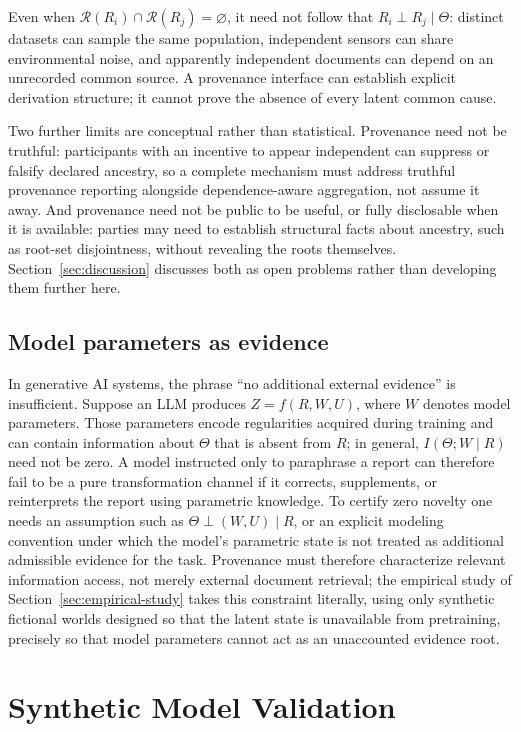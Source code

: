 \documentclass[11pt]{article}
\theoremstyle{definition}
\begin{document}
Even when $\mathcal R(R_i)\cap\mathcal R(R_j)=\varnothing$, it need not follow that $R_i\perp R_j\mid\Theta$: distinct datasets can sample the same population, independent sensors can share environmental noise, and apparently independent documents can depend on an unrecorded common source. A provenance interface can establish explicit derivation structure; it cannot prove the absence of every latent common cause.

Two further limits are conceptual rather than statistical. Provenance need not be truthful: participants with an incentive to appear independent can suppress or falsify declared ancestry, so a complete mechanism must address truthful provenance reporting alongside dependence-aware aggregation, not assume it away. And provenance need not be public to be useful, or fully disclosable when it is available: parties may need to establish structural facts about ancestry, such as root-set disjointness, without revealing the roots themselves. Section~\ref{sec:discussion} discusses both as open problems rather than developing them further here.

\subsection{Model parameters as evidence}
\label{sec:model-params}

In generative AI systems, the phrase ``no additional external evidence'' is insufficient. Suppose an LLM produces $Z=f(R,W,U)$, where $W$ denotes model parameters. Those parameters encode regularities acquired during training and can contain information about $\Theta$ that is absent from $R$; in general, $I(\Theta;W\mid R)$ need not be zero. A model instructed only to paraphrase a report can therefore fail to be a pure transformation channel if it corrects, supplements, or reinterprets the report using parametric knowledge. To certify zero novelty one needs an assumption such as $\Theta\perp(W,U)\mid R$, or an explicit modeling convention under which the model's parametric state is not treated as additional admissible evidence for the task. Provenance must therefore characterize relevant information access, not merely external document retrieval; the empirical study of Section~\ref{sec:empirical-study} takes this constraint literally, using only synthetic fictional worlds designed so that the latent state is unavailable from pretraining, precisely so that model parameters cannot act as an unaccounted evidence root.

\section{Synthetic Model Validation}
\label{sec:simulation}
\end{document}

